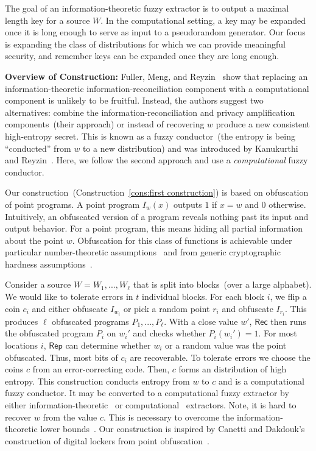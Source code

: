 \documentclass[11pt]{article}
\newcommand{\consref}[1]{\mbox{Construction~\ref{#1}}}
\newcommand{\class}[1]{{\ensuremath{\mathsf{#1}}}}
\newcommand{\rep}{\ensuremath{\class{Rep}}\xspace}
\newcommand{\rec}{\ensuremath{\class{Rec}}\xspace}
\begin{document}
The goal of an information-theoretic fuzzy extractor is to output a maximal length key for a source $W$.  
In the computational setting, a key may be expanded once it is long enough to serve as input to a pseudorandom generator.  Our focus is expanding the class of distributions for which we can provide meaningful security, and remember keys can be expanded once they are long enough.

\textbf{Overview of Construction:}  Fuller, Meng, and Reyzin~\cite[Corollary 3.8, Theorem 3.10]{fuller2013computational} show that replacing an information-theoretic information-reconciliation component with a computational component is unlikely to be fruitful.  Instead, the authors suggest two alternatives: combine the information-reconciliation and privacy amplification components~(their approach) or instead of recovering $w$ produce a new consistent high-entropy secret.  This is known as a fuzzy conductor~(the entropy is being ``conducted'' from $w$ to a new distribution) and was introduced by Kanukurthi and Reyzin~\cite{KanukurthiR09}.  Here, we follow the second approach and use a \emph{computational} fuzzy conductor.

Our construction~(\consref{cons:first construction}) is based on obfuscation of point programs.  A point program $I_w(x)$ outputs $1$ if $x=w$ and $0$ otherwise.  Intuitively, an obfuscated version of a program reveals nothing past its input and output behavior.  For a point program, this means hiding all partial information about the point $w$.  Obfuscation for this class of functions is achievable under particular number-theoretic assumptions~\cite{canetti1997towards} and from generic cryptographic hardness assumptions~\cite{wee2005obfuscating}.  

Consider a source $W = W_1,..., W_\ell$ that is split into blocks~(over a large alphabet).  We would like to tolerate errors in $t$ individual blocks.  For each block $i$, we flip a coin $c_i$ and either obfuscate $I_{w_i}$ or pick a random point $r_i$ and obfuscate $I_{r_i}$.  This produces $\ell$ obfuscated programs $P_1,..., P_\ell$.  With a close value $w'$, $\rec$ then runs the obfuscated program $P_i$ on $w_i'$ and checks whether $P_i(w_i')=1$.  For most locations $i$, \rep can determine whether $w_i$ or a random value was the point obfuscated.  Thus, most bits of $c_i$ are recoverable. To tolerate errors we choose the coins $c$ from an error-correcting code.  Then, $c$ forms an distribution of high entropy.  This construction conducts entropy from $w$ to $c$ and is a computational fuzzy conductor.  It may be converted to a computational fuzzy extractor by either information-theoretic~\cite{nisan1993randomness} or computational~\cite{krawczyk2010cryptographic} extractors.  Note, it is hard to recover $w$ from the value $c$.   This is necessary to overcome the information-theoretic lower bounds~\cite[Section 3.3]{fuller2013computational}.  
Our construction is inspired by Canetti and Dakdouk's construction of digital lockers from point obfuscation~\cite{canetti2008obfuscating}.  
\end{document}
